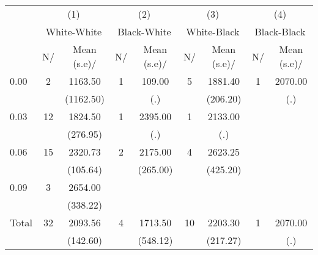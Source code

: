 \begin{tabular*}{\hsize}{@{\hskip\tabcolsep\extracolsep\fill}l*{4}{cc}} \hline\hline
                    &\multicolumn{2}{c}{(1)}  &\multicolumn{2}{c}{(2)}  &\multicolumn{2}{c}{(3)}  &\multicolumn{2}{c}{(4)}  \\
                    &\multicolumn{2}{c}{White-White}&\multicolumn{2}{c}{Black-White}&\multicolumn{2}{c}{White-Black}&\multicolumn{2}{c}{Black-Black}\\
                    &N\?/\hspace{0.01cm}&Mean (s.e)\?/\hspace{0.01cm}&N\?/\hspace{0.01cm}&Mean (s.e)\?/\hspace{0.01cm}&N\?/\hspace{0.01cm}&Mean (s.e)\?/\hspace{0.01cm}&N\?/\hspace{0.01cm}&Mean (s.e)\?/\hspace{0.01cm}\\
\hline
0.00                &           2&     1163.50&           1&      109.00&           5&     1881.40&           1&     2070.00\\
                    &            &   (1162.50)&            &         (.)&            &    (206.20)&            &         (.)\\
[1em]
0.03                &          12&     1824.50&           1&     2395.00&           1&     2133.00&            &            \\
                    &            &    (276.95)&            &         (.)&            &         (.)&            &            \\
[1em]
0.06                &          15&     2320.73&           2&     2175.00&           4&     2623.25&            &            \\
                    &            &    (105.64)&            &    (265.00)&            &    (425.20)&            &            \\
[1em]
0.09                &           3&     2654.00&            &            &            &            &            &            \\
                    &            &    (338.22)&            &            &            &            &            &            \\
[1em]
Total               &          32&     2093.56&           4&     1713.50&          10&     2203.30&           1&     2070.00\\
                    &            &    (142.60)&            &    (548.12)&            &    (217.27)&            &         (.)\\
\hline\hline
\end{tabular*}
